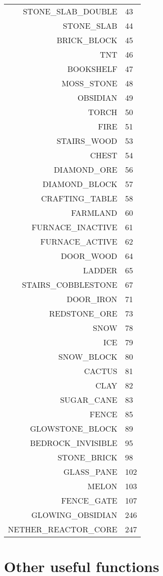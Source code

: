 \begin{appendices}
\begin{tabular}{rl}
				STONE\_SLAB\_DOUBLE & 43 \\
				STONE\_SLAB & 44 \\
				BRICK\_BLOCK & 45 \\
				TNT & 46 \\
				BOOKSHELF & 47 \\
				MOSS\_STONE & 48 \\
				OBSIDIAN & 49 \\
				TORCH & 50 \\
				FIRE & 51 \\
				STAIRS\_WOOD & 53 \\
				CHEST & 54 \\
				DIAMOND\_ORE & 56 \\
				DIAMOND\_BLOCK & 57 \\
				CRAFTING\_TABLE & 58 \\
				FARMLAND & 60 \\
				FURNACE\_INACTIVE & 61 \\
				FURNACE\_ACTIVE & 62 \\
				DOOR\_WOOD & 64 \\
				LADDER & 65 \\
				STAIRS\_COBBLESTONE & 67 \\
				DOOR\_IRON & 71 \\
				REDSTONE\_ORE & 73 \\
				SNOW & 78 \\
				ICE & 79 \\
				SNOW\_BLOCK & 80 \\
				CACTUS & 81 \\
				CLAY & 82 \\
				SUGAR\_CANE & 83 \\
				FENCE & 85 \\
				GLOWSTONE\_BLOCK & 89 \\
				BEDROCK\_INVISIBLE & 95 \\
				STONE\_BRICK & 98 \\
				GLASS\_PANE & 102 \\
				MELON & 103 \\
				FENCE\_GATE & 107 \\
				GLOWING\_OBSIDIAN & 246 \\
				NETHER\_REACTOR\_CORE & 247
			\end{tabular}
			\normalsize

		\webclearpage
		\section{Other useful functions}


\end{appendices}
